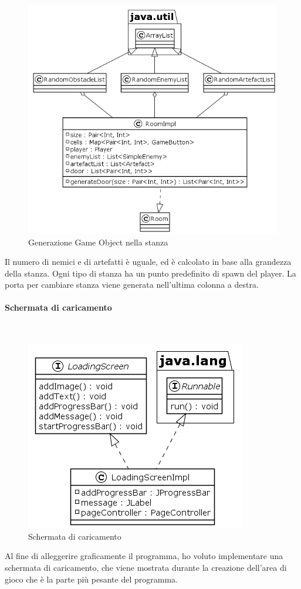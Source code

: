 \documentclass[a4paper,titlepage,12pt]{article}
\begin{document}
\begin{figure}[H]
    \centering
    \includegraphics[scale=0.7]{img/uml/Room2.png}
    \caption{Generazione Game Object nella stanza}
    \label{fig: Stanza}
\end{figure}
\par \noindent Il numero di nemici e di artefatti è uguale, ed è calcolato in base alla grandezza della stanza. Ogni tipo di stanza ha un punto predefinito di spawn del player. La porta per cambiare stanza viene generata nell’ultima colonna a destra.
\newpage
\paragraph{Schermata di caricamento}
\par \noindent \\
\begin{figure}[H]
    \centering
    \includegraphics[scale=0.7]{img/uml/loading_screen.png}
    \caption{Schermata di caricamento}
    \label{fig: Loading screen}
\end{figure}
\par \noindent Al fine di alleggerire graficamente il programma, ho voluto implementare una schermata di caricamento, che viene mostrata durante la creazione dell’area di gioco che è la parte più pesante del programma.
\newpage
\end{document}
